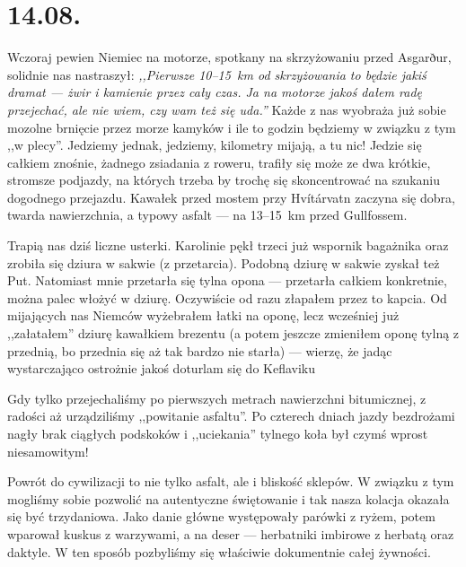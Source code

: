 \chapter*{14.08.}

Wczoraj pewien Niemiec na motorze, spotkany na skrzyżowaniu przed Asgarður, solidnie nas nastraszył: \emph{,,Pierwsze 10--15~km od skrzyżowania to będzie jakiś dramat --- żwir i kamienie przez cały czas. Ja na motorze jakoś dałem radę przejechać, ale nie wiem, czy wam też się uda.''} Każde z nas wyobraża już sobie mozolne brnięcie przez morze kamyków i ile to godzin będziemy w związku z tym ,,w plecy''. Jedziemy jednak, jedziemy, kilometry mijają, a tu nic! Jedzie się całkiem znośnie, żadnego zsiadania z roweru, trafiły się może ze dwa krótkie, stromsze podjazdy, na których trzeba by trochę się skoncentrować na szukaniu dogodnego przejazdu. Kawałek przed mostem przy Hvítárvatn zaczyna się dobra, twarda nawierzchnia, a typowy asfalt --- na 13--15~km przed Gullfossem.


Trapią nas dziś liczne usterki. Karolinie pękł trzeci już wspornik bagażnika oraz zrobiła się dziura w sakwie (z przetarcia). Podobną dziurę w sakwie zyskał też Put. Natomiast mnie przetarła się tylna opona --- przetarła całkiem konkretnie, można palec włożyć w dziurę. Oczywiście od razu złapałem przez to kapcia. Od mijających nas Niemców wyżebrałem łatki na oponę, lecz wcześniej już ,,załatałem'' dziurę kawałkiem brezentu (a potem jeszcze zmieniłem oponę tylną z przednią, bo przednia się aż tak bardzo nie starła) --- wierzę, że jadąc wystarczająco ostrożnie jakoś doturlam się do Keflaviku\textellipsis


Gdy tylko przejechaliśmy po pierwszych metrach nawierzchni bitumicznej, z radości aż urządziliśmy ,,powitanie asfaltu''. Po czterech dniach jazdy bezdrożami nagły brak ciągłych podskoków i ,,uciekania'' tylnego koła był czymś wprost niesamowitym!

Powrót do cywilizacji to nie tylko asfalt, ale i bliskość sklepów. W związku z tym mogliśmy sobie pozwolić na autentyczne świętowanie i tak nasza kolacja okazała się być trzydaniowa. Jako danie główne występowały parówki z ryżem, potem wparował kuskus z warzywami, a na deser --- herbatniki imbirowe z herbatą oraz daktyle. W ten sposób pozbyliśmy się właściwie dokumentnie całej żywności.

